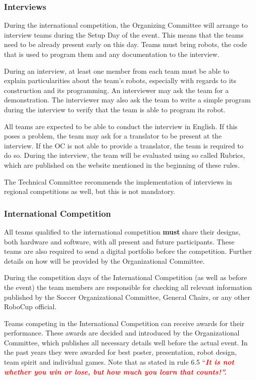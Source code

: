\documentclass{article}
\begin{document}
\subsubsection{Interviews \label{ref-060}}

During the international competition, the Organizing Committee will arrange to
interview teams during the Setup Day of the event. This means that the teams
need to be already present early on this day. Teams must bring robots, the code
that is used to program them and any documentation to the interview.

During an interview, at least one member from each team must be able to explain
particularities about the team's robots, especially with regards to its
construction and its programming. An interviewer may ask the team for a
demonstration. The interviewer may also ask the team to write a simple program
during the interview to verify that the team is able to program its robot.

All teams are expected to be able to conduct the interview in English. If this
poses a problem, the team may ask for a translator to be present at the
interview. If the OC is not able to provide a translator, the team is required
to do so. During the interview, the team will be evaluated using so called
Rubrics, which are published on the website mentioned in the beginning of these
rules.

The Technical Committee recommends the implementation of interviews in regional
competitions as well, but this is not mandatory.

\subsubsection{International Competition \label{ref-061}}

All teams qualified to the international competition \textbf{must} share their
designs, both hardware and software, with all present and future participants.
These teams are also required to send a digital portfolio before the
competition. Further details on how will be provided by the Organizational
Committee.

During the competition days of the International Competition (as well as before
the event) the team members are responsible for checking all relevant
information published by the Soccer Organizational Committee, General Chairs,
or any other RoboCup official.

Teams competing in the International Competition can receive awards for their
performance. These awards are decided and introduced by the Organizational
Committee, which publishes all necessary details well before the actual event.
In the past years they were awarded for best poster, presentation, robot
design, team spirit and individual games. Note that as stated in rule 6.5
``\textbf{\textit{\textcolor{red}{It is not whether you win or lose, but how
much you learn that counts!''.}}}
\end{document}
